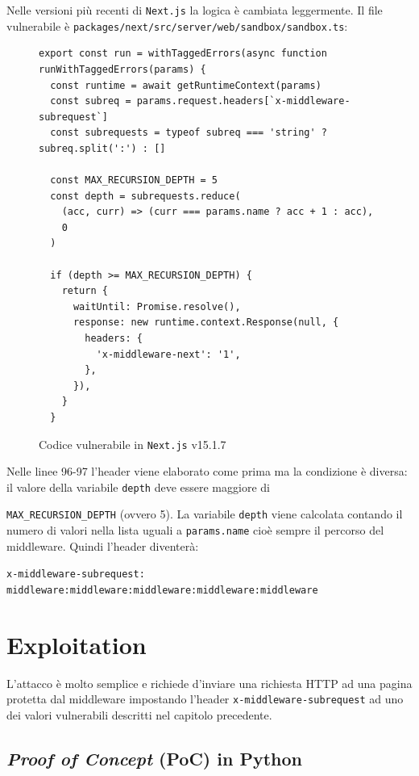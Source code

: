 \documentclass[a4paper,oneside,12pt]{report}
\begin{document}
Nelle versioni pi\`u recenti di \texttt{Next.js} la logica \`e cambiata leggermente. Il file vulnerabile \`e \texttt{packages/next/src/server/web/sandbox/sandbox.ts}:
\begin{figure}[H]
	\centering
\begin{verbatim}
export const run = withTaggedErrors(async function runWithTaggedErrors(params) {
  const runtime = await getRuntimeContext(params)
  const subreq = params.request.headers[`x-middleware-subrequest`]
  const subrequests = typeof subreq === 'string' ? subreq.split(':') : []

  const MAX_RECURSION_DEPTH = 5
  const depth = subrequests.reduce(
    (acc, curr) => (curr === params.name ? acc + 1 : acc),
    0
  )

  if (depth >= MAX_RECURSION_DEPTH) {
    return {
      waitUntil: Promise.resolve(),
      response: new runtime.context.Response(null, {
        headers: {
          'x-middleware-next': '1',
        },
      }),
    }
  }
\end{verbatim}
	\caption{Codice vulnerabile in \texttt{Next.js} v15.1.7}
	\label{fig:nextjs-vulnerable-code-v15.1.7}
\end{figure}
Nelle linee 96-97 l'header viene elaborato come prima ma la condizione \`e diversa: il valore della variabile \texttt{depth} deve essere maggiore di \raggedright\texttt{MAX\_RECURSION\_DEPTH} (ovvero 5). La variabile \texttt{depth} viene calcolata contando il numero di valori nella lista uguali a \texttt{params.name} cio\`e sempre il percorso del middleware. Quindi l'header diventer\`a:
\begin{center}
	\scriptsize
	\texttt{x-middleware-subrequest: middleware:middleware:middleware:middleware:middleware}
\end{center}

\chapter{Exploitation}
\label{chap:exploitation}

L'attacco \`e molto semplice e richiede d'inviare una richiesta HTTP ad una pagina protetta dal middleware impostando l'header \texttt{x-middleware-subrequest} ad uno dei valori vulnerabili descritti nel capitolo precedente.

\section{\textit{Proof of Concept} (PoC) in Python}
\label{sec:poc-python}
\end{document}
